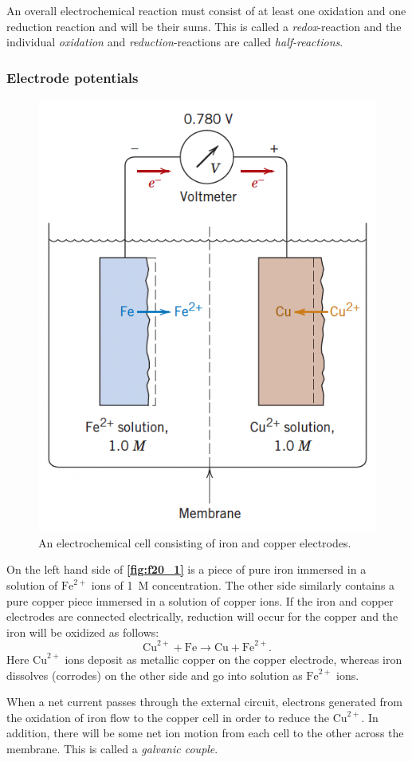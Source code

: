 An overall electrochemical reaction must consist of at least one oxidation and one reduction reaction and will be their sums. This is called a \textit{redox}-reaction and the individual \textit{oxidation} and \textit{reduction}-reactions are called \textit{half-reactions}.

\subsubsection{Electrode potentials}

\begin{figure} [ht]
  \centering
  \includegraphics[width=0.5\linewidth]{./figures/f20_1.png}
  \caption{An electrochemical cell consisting of iron and copper electrodes.}
  \label{fig:f20_1}
\end{figure}

On the left hand side of \textbf{\autoref{fig:f20_1}} is a piece of pure iron immersed in a solution of $\mathrm{Fe}^{2+}$ ions of \qty{1}{M} concentration. The other side similarly contains a pure copper piece immersed in a solution of copper ions. If the iron and copper electrodes are connected electrically, reduction will occur for the copper and the iron will be oxidized as follows:
\[ 
\mathrm{Cu}^{2+} + \mathrm{Fe} \rightarrow \mathrm{Cu} + \mathrm{Fe}^{2+}
.\]
Here $\mathrm{Cu}^{2+}$ ions deposit as metallic copper on the copper electrode, whereas iron dissolves (corrodes) on the other side and go into solution as $\mathrm{Fe}^{2+}$ ions. 

When a net current passes through the external circuit, electrons generated from the oxidation of iron flow to the copper cell in order to reduce the $\mathrm{Cu}^{2+}$. In addition, there will be some net ion motion from each cell to the other across the membrane. This is called a \textit{galvanic couple}.

